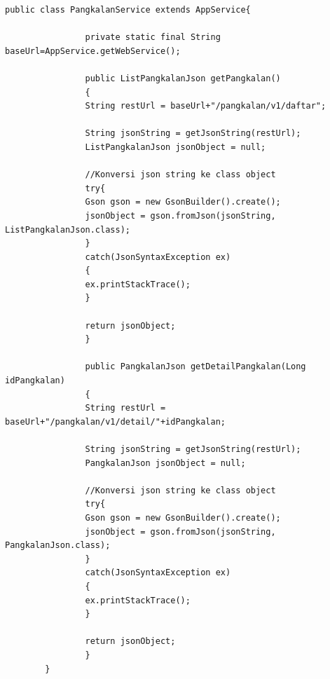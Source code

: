 \begin{enumerate}[a.]
			\begin{lstlisting}[caption=Potongan kode \textit{model} aplikasi berbasis web, label=modelWeb]
			public class PangkalanService extends AppService{
				
				private static final String baseUrl=AppService.getWebService();
				
				public ListPangkalanJson getPangkalan()
				{
				String restUrl = baseUrl+"/pangkalan/v1/daftar";
				
				String jsonString = getJsonString(restUrl);
				ListPangkalanJson jsonObject = null;
				
				//Konversi json string ke class object
				try{
				Gson gson = new GsonBuilder().create();
				jsonObject = gson.fromJson(jsonString, ListPangkalanJson.class);            
				}
				catch(JsonSyntaxException ex)
				{
				ex.printStackTrace();
				}
				
				return jsonObject;
				}
				
				public PangkalanJson getDetailPangkalan(Long idPangkalan)
				{
				String restUrl = baseUrl+"/pangkalan/v1/detail/"+idPangkalan;
				
				String jsonString = getJsonString(restUrl);
				PangkalanJson jsonObject = null;
				
				//Konversi json string ke class object
				try{
				Gson gson = new GsonBuilder().create();
				jsonObject = gson.fromJson(jsonString, PangkalanJson.class);            
				}
				catch(JsonSyntaxException ex)
				{
				ex.printStackTrace();
				}
				
				return jsonObject;
				}
		}
		
		\end{lstlisting}
		

\end{enumerate}
